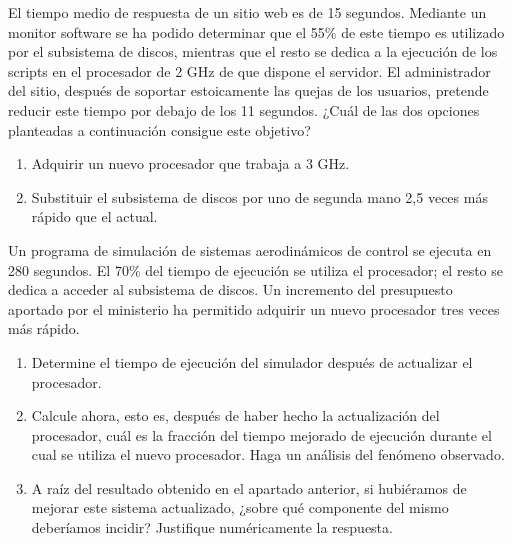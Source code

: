 \begin{ejercicio}
El tiempo medio de respuesta de un sitio web es de 15 segundos. Mediante un monitor software se ha podido determinar que el 55\% de este tiempo es utilizado por el subsistema de discos, mientras que el resto se dedica a la ejecución de los scripts en el procesador de 2 GHz de que dispone el servidor. El administrador del sitio, después de soportar estoicamente las quejas de los usuarios, pretende reducir este tiempo por debajo de los 11 segundos. ¿Cuál de las dos opciones planteadas a continuación consigue este objetivo?
\begin{enumerate}
    \item Adquirir un nuevo procesador que trabaja a 3 GHz.
    \item Substituir el subsistema de discos por uno de segunda mano 2,5 veces más rápido que el actual.
\end{enumerate}
\end{ejercicio}

\begin{ejercicio}
Un programa de simulación de sistemas aerodinámicos de control se ejecuta en 280 segundos. El 70\% del tiempo de ejecución se utiliza el procesador; el resto se dedica a acceder al subsistema de discos. Un incremento del presupuesto aportado por el ministerio ha permitido adquirir un nuevo procesador tres veces más rápido.
\begin{enumerate}
    \item Determine el tiempo de ejecución del simulador después de actualizar el procesador.
    \item Calcule ahora, esto es, después de haber hecho la actualización del procesador, cuál es la fracción del tiempo mejorado de ejecución durante el cual se utiliza el nuevo procesador. Haga un análisis del fenómeno observado.
    \item A raíz del resultado obtenido en el apartado anterior, si hubiéramos de mejorar este sistema actualizado, ¿sobre qué componente del mismo deberíamos incidir? Justifique numéricamente la respuesta.
\end{enumerate}
\end{ejercicio}

